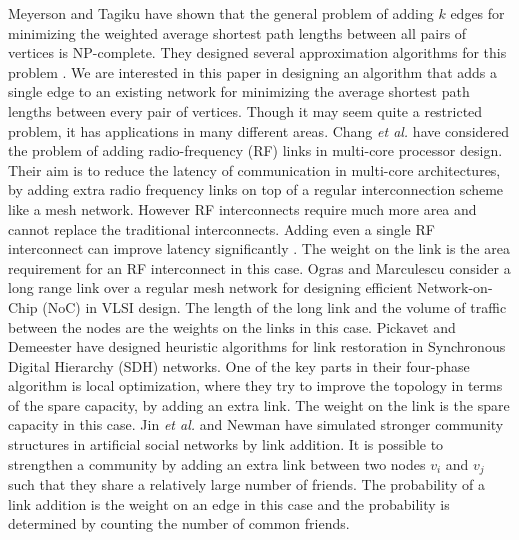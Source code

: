 \documentclass[10pt,letterpaper]{article}
\begin{document}
Meyerson and Tagiku \cite{MT} have shown that the general problem of adding $k$ edges for minimizing 
the weighted average shortest path lengths between all pairs of vertices is NP-complete. They designed 
several approximation algorithms for this problem \cite{MT}. We are 
interested in this paper in designing an algorithm that adds a single edge to an existing network 
for minimizing the average shortest path lengths between every pair of vertices. Though it may 
seem quite a restricted problem, it has applications in many different areas. Chang {\em et al.}
\cite{CCKN,CSTC} have considered the problem of adding radio-frequency (RF) links in multi-core processor 
design. Their aim is to reduce the latency of communication in multi-core architectures, by adding 
extra radio frequency links on top of a regular interconnection scheme like a mesh network. However 
RF interconnects require much more area and cannot replace the traditional interconnects. Adding even 
a single RF interconnect can improve latency significantly \cite{CCKN,CSTC}. The weight on 
the link is the area requirement for an RF interconnect in this case. Ogras and Marculescu \cite{OM} 
consider a long range link over a regular mesh network for designing efficient Network-on-Chip (NoC) 
in VLSI design. The length of the long link and the volume of traffic between the nodes are  the weights 
on the links in this case. Pickavet and Demeester 
\cite{PD} have designed heuristic algorithms for link restoration in Synchronous Digital Hierarchy (SDH)
networks. One of the key parts in their four-phase algorithm is local optimization, where they 
try to improve the topology in terms of the spare capacity, by adding an extra link. The weight 
on the link is the spare capacity in this case. Jin {\em et al.} \cite{JGN} and Newman \cite{N} 
have simulated stronger community structures in artificial social networks by link addition. It 
is possible to strengthen a community by adding an extra link between two nodes $v_i$ and $v_j$ 
such that they share a relatively large number of friends. The probability of a link addition 
is the weight on an edge in this case and the probability is determined by counting the number of common 
friends.     
\end{document}

